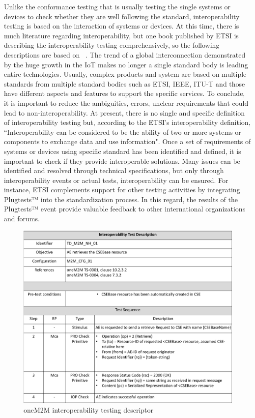Unlike the conformance testing that is usually testing the single systems or devices to check whether they are well following the standard, interoperability testing is based on the interaction of systems or devices. At this time, there is much literature regarding interoperability, but one book published by ETSI is describing the interoperability testing comprehensively, so the following descriptions are based on ~\cite{etsibookforinterop}. The trend of a global interconnection demonstrated by the huge growth in the IoT makes no longer a single standard body is leading entire technologies. Usually, complex products and system are based on multiple standards from multiple standard bodies such as ETSI, IEEE, ITU-T and those have different aspects and features to support the specific services. To conclude, it is important to reduce the ambiguities, errors, unclear requirements that could lead to non-interoperability. At present, there is no single and specific definition of interoperability testing but, according to the ETSI's interoperability definition, ``Interoperability can be considered to be the ability of two or more systems or components to exchange data and use information". Once a set of requirements of systems or devices using specific standard has been identified and defined, it is important to check if they provide interoperable solutions. Many issues can be identified and resolved through technical specifications, but only through interoperability events or actual tests,  interoperability can be ensured. For instance, ETSI complements support for other testing activities by integrating Plugtests™ into the standardization process. In this regard, the results of the Plugtests™ event provide valuable feedback to other international organizations and forums.

\begin{figure}[H]			%
	\centering
	\includegraphics[width=\textwidth]{figures/fig_interoperablity_testing_description.pdf}
    \caption{oneM2M interoperability testing descriptor}
    \label{fig:interoperability_test_descriptor}
\end{figure}


